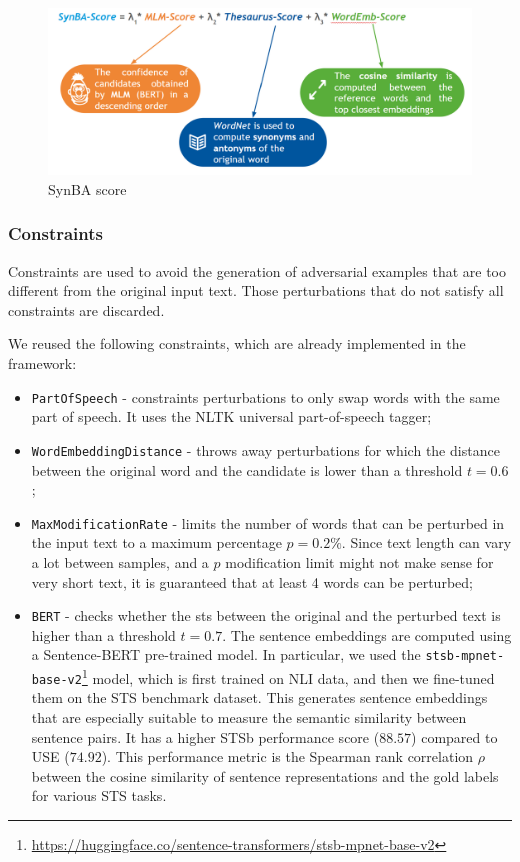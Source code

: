 \begin{figure}
    \centering
    \includegraphics[width=0.8\linewidth]{images/3_3_synba_score.png}
    \caption{SynBA score}
    \label{fig:3_3_synba_score}
\end{figure}


\subsubsection{Constraints}\label{subsubsec:constraints}

Constraints are used to avoid the generation of adversarial examples that are too different from the original input text.
Those perturbations that do not satisfy all constraints are discarded.

We reused the following constraints, which are already implemented in the framework:
\begin{itemize}
    \item \texttt{PartOfSpeech} - constraints perturbations to only swap words with the same part of speech. It uses the NLTK universal part-of-speech tagger;
    \item \texttt{WordEmbeddingDistance} - throws away perturbations for which the distance between the original word and the candidate is lower than a threshold $t=0.6$;
    \item \texttt{MaxModificationRate} - limits the number of words that can be perturbed in the input text to a maximum percentage $p=0.2\%$. Since text length can vary a lot between samples, and a $p$ modification limit might not make sense for very short text, it is guaranteed that at least 4 words can be perturbed;
    \item \texttt{BERT} - checks whether the \acrfull{sts} between the original and the perturbed text is higher than a threshold $t=0.7$. The  sentence embeddings are computed using a Sentence-BERT \cite{reimers2019sentencebert} pre-trained model. In particular, we used the \texttt{stsb-mpnet-base-v2}\footnote{\url{https://huggingface.co/sentence-transformers/stsb-mpnet-base-v2}} model, which is first trained on NLI data, and then we fine-tuned them on the STS benchmark dataset. This generates sentence embeddings that are especially suitable to measure the semantic similarity between sentence pairs.
    It has a higher STSb performance score ($88.57$) compared to USE ($74.92$). This performance metric is the Spearman rank correlation $\rho$ between the cosine similarity of sentence representations and the gold labels for various STS tasks.
\end{itemize}           


